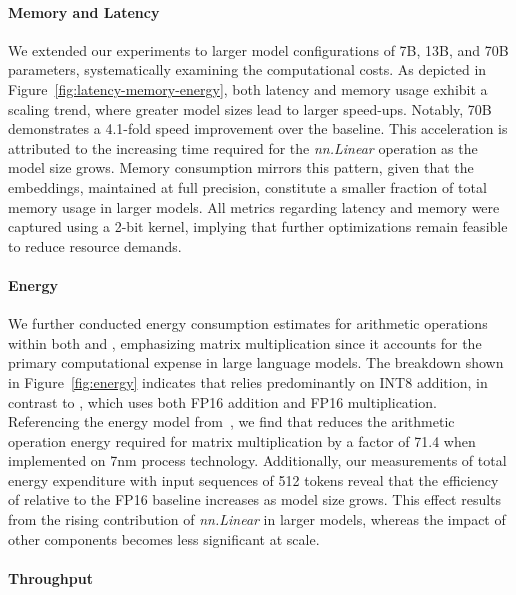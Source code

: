 \paragraph{Memory and Latency}

We extended our experiments to larger model configurations of 7B, 13B, and 70B parameters, systematically examining the computational costs. As depicted in Figure~\ref{fig:latency-memory-energy}, both latency and memory usage exhibit a scaling trend, where greater model sizes lead to larger speed-ups. Notably,  70B demonstrates a 4.1-fold speed improvement over the  baseline. This acceleration is attributed to the increasing time required for the \emph{nn.Linear} operation as the model size grows. Memory consumption mirrors this pattern, given that the embeddings, maintained at full precision, constitute a smaller fraction of total memory usage in larger models. All metrics regarding latency and memory were captured using a 2-bit kernel, implying that further optimizations remain feasible to reduce resource demands.

\paragraph{Energy}

We further conducted energy consumption estimates for arithmetic operations within both  and , emphasizing matrix multiplication since it accounts for the primary computational expense in large language models. The breakdown shown in Figure~\ref{fig:energy} indicates that  relies predominantly on INT8 addition, in contrast to , which uses both FP16 addition and FP16 multiplication. Referencing the energy model from~\cite{energycost, pokebnn}, we find that  reduces the arithmetic operation energy required for matrix multiplication by a factor of 71.4 when implemented on 7nm process technology. Additionally, our measurements of total energy expenditure with input sequences of 512 tokens reveal that the efficiency of  relative to the FP16  baseline increases as model size grows. This effect results from the rising contribution of \emph{nn.Linear} in larger models, whereas the impact of other components becomes less significant at scale.

\paragraph{Throughput}

